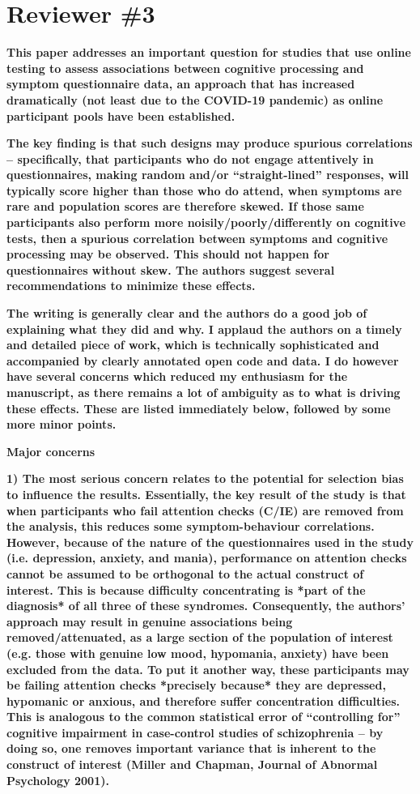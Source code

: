 \documentclass[a4paper,notitlepage,12pt]{article}
\begin{document}
\section*{Reviewer \#3}

\textbf{This paper addresses an important question for studies that use online testing to assess associations between cognitive processing and symptom questionnaire data, an approach that has increased dramatically (not least due to the COVID-19 pandemic) as online participant pools have been established.}

\textbf{The key finding is that such designs may produce spurious correlations – specifically, that participants who do not engage attentively in questionnaires, making random and/or ``straight-lined'' responses, will typically score higher than those who do attend, when symptoms are rare and population scores are therefore skewed. If those same participants also perform more noisily/poorly/differently on cognitive tests, then a spurious correlation between symptoms and cognitive processing may be observed. This should not happen for questionnaires without skew. The authors suggest several recommendations to minimize these effects.}

\textbf{The writing is generally clear and the authors do a good job of explaining what they did and why. I applaud the authors on a timely and detailed piece of work, which is technically sophisticated and accompanied by clearly annotated open code and data. I do however have several concerns which reduced my enthusiasm for the manuscript, as there remains a lot of ambiguity as to what is driving these effects. These are listed immediately below, followed by some more minor points.}

\textbf{Major concerns}

\textbf{1) The most serious concern relates to the potential for selection bias to influence the results. Essentially, the key result of the study is that when participants who fail attention checks (C/IE) are removed from the analysis, this reduces some symptom-behaviour correlations. However, because of the nature of the questionnaires used in the study (i.e. depression, anxiety, and mania), performance on attention checks cannot be assumed to be orthogonal to the actual construct of interest. This is because difficulty concentrating is *part of the diagnosis* of all three of these syndromes. Consequently, the authors' approach may result in genuine associations being removed/attenuated, as a large section of the population of interest (e.g. those with genuine low mood, hypomania, anxiety) have been excluded from the data. To put it another way, these participants may be failing attention checks *precisely because* they are depressed, hypomanic or anxious, and therefore suffer concentration difficulties. This is analogous to the common statistical error of ``controlling for'' cognitive impairment in case-control studies of schizophrenia – by doing so, one removes important variance that is inherent to the construct of interest (Miller and Chapman, Journal of Abnormal Psychology 2001).}
\end{document}
